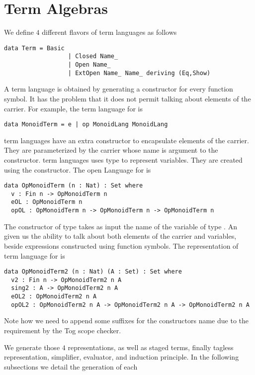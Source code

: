 \section{Term Algebras}
We define $4$ different flavors of term languages as follows 
\begin{verbatim}
data Term = Basic
                  | Closed Name_
                  | Open Name_
                  | ExtOpen Name_ Name_ deriving (Eq,Show)
\end{verbatim}
A  term language is obtained by generating a constructor for every function symbol. It has the problem that it does not permit talking about elements of the carrier. For example, the  term language for  is 
\begin{lstlisting}
data MonoidTerm = e | op MonoidLang MonoidLang
\end{lstlisting}
 term languages have an extra constructor  to encapsulate elements of the carrier. They are parameterized by the carrier whose name is argument to the  constructor. 
 term languages uses  type to represent variables. They are created using the  constructor. The open Language for  is 
\begin{lstlisting}
data OpMonoidTerm (n : Nat) : Set where
  v : Fin n -> OpMonoidTerm n
  eOL : OpMonoidTerm n
  opOL : OpMonoidTerm n -> OpMonoidTerm n -> OpMonoidTerm n
\end{lstlisting}
The constructor  of type  takes as input the name of the variable of type . 
An  given us the ability to talk about both elements of the carrier and variables, beside expressions constructed using function symbols. The representation of  term language for  is 
\begin{lstlisting}
data OpMonoidTerm2 (n : Nat) (A : Set) : Set where
  v2 : Fin n -> OpMonoidTerm2 n A
  sing2 : A -> OpMonoidTerm2 n A
  eOL2 : OpMonoidTerm2 n A
  opOL2 : OpMonoidTerm2 n A -> OpMonoidTerm2 n A -> OpMonoidTerm2 n A
\end{lstlisting}
Note how we need to append some suffixes for the constructors name due to the requirement by the Tog scope checker. 

We generate those $4$ representations, as well as staged terms, finally tagless representation, simplifier, evaluator, and induction principle. In the following subsections we detail the generation of each 

